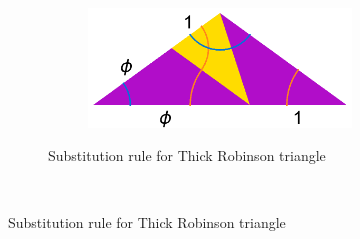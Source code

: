\documentclass[]{article}
\begin{document}
\begin{figure}[H]
        \centering
        \begin{subfigure}[t]{\textwidth}
        \begin{subfigure}[t]{0.4\textwidth}
                \centering
        \end{subfigure}\hfill \raisebox{30px}{\huge$\rightarrow$} \hfill%
        ~ %
        \begin{subfigure}[t]{0.4\textwidth}
                \centering
                \includegraphics[scale=0.4]{RobFatSub}
        \end{subfigure}
        \caption{Substitution rule for Thick Robinson triangle}
        \label{fig:RobSubThick}
        \end{subfigure}
        ~ %
          

\end{figure}
\end{document}
